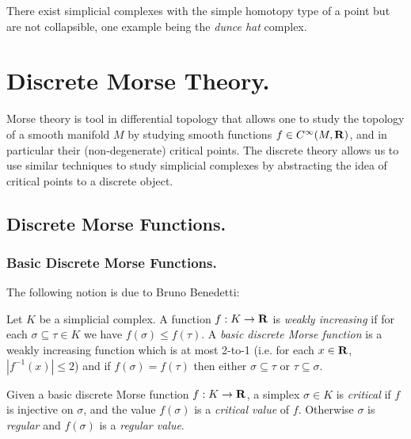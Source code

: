 
\begin{remark}
    There exist simplicial complexes with the simple homotopy type of a point but are not collapsible, one example being the \emph{dunce hat}
    complex\autocite{duncehat}.
\end{remark}

\section{Discrete Morse Theory.}

Morse theory is tool in differential topology that allows one to study the topology of a smooth manifold $M$ by studying smooth functions
$f \in C^\infty(M, \mathbf{R})$, and in particular their (non-degenerate) critical points\autocite{morsetheory}. The discrete theory allows us to use
similar techniques to study simplicial complexes by abstracting the idea of critical points to a discrete object.

\subsection{Discrete Morse Functions.}

\subsubsection{Basic Discrete Morse Functions.}

The following notion is due to Bruno Benedetti:

\begin{definition}
    Let $K$ be a simplicial complex. A function $f : K \to \mathbf{R}$ is \emph{weakly increasing} if for each $\sigma \subseteq \tau \in K$ we have
    $f(\sigma) \leq f(\tau)$. A \emph{basic discrete Morse function} is a weakly increasing function which is at most 2-to-1 (i.e. for each
    $x \in \mathbf{R}$, $|f^{-1}(x)| \leq 2$) and if $f(\sigma) = f(\tau)$ then either $\sigma \subseteq \tau$ or $\tau \subseteq \sigma$.  
\end{definition}

\begin{definition}
    Given a basic discrete Morse function $f : K \to \mathbf{R}$, a simplex $\sigma \in K$ is \emph{critical} if $f$ is injective on $\sigma$,
    and the value $f(\sigma)$ is a \emph{critical value} of $f$. Otherwise $\sigma$ is \emph{regular} and $f(\sigma)$ is a \emph{regular value}.
\end{definition}

